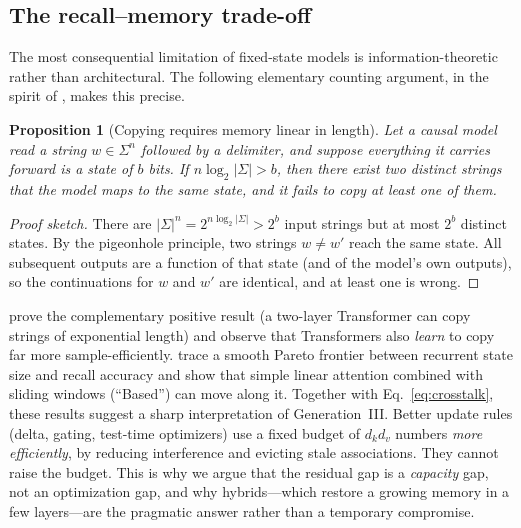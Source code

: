 \documentclass[a4paper]{article}
\theoremstyle{plain}
\newtheorem{proposition}{Proposition}
\theoremstyle{remark}
\begin{document}
\subsection{The recall--memory trade-off}
\label{sec:recall}
The most consequential limitation of fixed-state models is information-theoretic rather than architectural. The following elementary counting argument, in the spirit of \citet{jelassi2024repeat}, makes this precise.

\begin{proposition}[Copying requires memory linear in length]
\label{prop:copy}
Let a causal model read a string $w\in\Sigma^n$ followed by a delimiter, and suppose everything it carries forward is a state of $b$ bits. If $n\log_2|\Sigma|>b$, then there exist two distinct strings that the model maps to the same state, and it fails to copy at least one of them.
\end{proposition}
\begin{proof}[Proof sketch]
There are $|\Sigma|^n=2^{n\log_2|\Sigma|}>2^b$ input strings but at most $2^b$ distinct states. By the pigeonhole principle, two strings $w\neq w'$ reach the same state. All subsequent outputs are a function of that state (and of the model's own outputs), so the continuations for $w$ and $w'$ are identical, and at least one is wrong.
\end{proof}

\noindent \citet{jelassi2024repeat} prove the complementary positive result (a two-layer Transformer can copy strings of exponential length) and observe that Transformers also \emph{learn} to copy far more sample-efficiently. \citet{arora2024based} trace a smooth Pareto frontier between recurrent state size and recall accuracy and show that simple linear attention combined with sliding windows (\textquotedblleft Based\textquotedblright) can move along it. Together with Eq.~\eqref{eq:crosstalk}, these results suggest a sharp interpretation of Generation~III. Better update rules (delta, gating, test-time optimizers) use a fixed budget of $d_kd_v$ numbers \emph{more efficiently}, by reducing interference and evicting stale associations. They cannot raise the budget. This is why we argue that the residual gap is a \emph{capacity} gap, not an optimization gap, and why hybrids---which restore a growing memory in a few layers---are the pragmatic answer rather than a temporary compromise.
\end{document}
